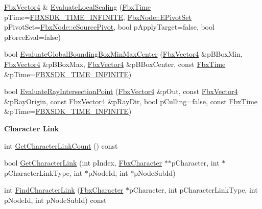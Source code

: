 \begin{Indent}
\begin{DoxyCompactItemize}
\item 
\hyperlink{class_fbx_vector4}{Fbx\+Vector4} \& \hyperlink{class_fbx_node_a4c3a18529955a1c4572850abb8ac37dc}{Evaluate\+Local\+Scaling} (\hyperlink{class_fbx_time}{Fbx\+Time} p\+Time=\hyperlink{fbxtime_8h_a1e6db3fe0f84f0b7daa775739f93526f}{F\+B\+X\+S\+D\+K\+\_\+\+T\+I\+M\+E\+\_\+\+I\+N\+F\+I\+N\+I\+TE}, \hyperlink{class_fbx_node_ae62b7311ac4727654cdf1ebd5cbf7343}{Fbx\+Node\+::\+E\+Pivot\+Set} p\+Pivot\+Set=\hyperlink{class_fbx_node_ae62b7311ac4727654cdf1ebd5cbf7343ae8ed37a5c7e41f8d1cec9d3fa8424b69}{Fbx\+Node\+::e\+Source\+Pivot}, bool p\+Apply\+Target=false, bool p\+Force\+Eval=false)
\item 
bool \hyperlink{class_fbx_node_a0e847ea3d090ef90c79051fd013a5966}{Evaluate\+Global\+Bounding\+Box\+Min\+Max\+Center} (\hyperlink{class_fbx_vector4}{Fbx\+Vector4} \&p\+B\+Box\+Min, \hyperlink{class_fbx_vector4}{Fbx\+Vector4} \&p\+B\+Box\+Max, \hyperlink{class_fbx_vector4}{Fbx\+Vector4} \&p\+B\+Box\+Center, const \hyperlink{class_fbx_time}{Fbx\+Time} \&p\+Time=\hyperlink{fbxtime_8h_a1e6db3fe0f84f0b7daa775739f93526f}{F\+B\+X\+S\+D\+K\+\_\+\+T\+I\+M\+E\+\_\+\+I\+N\+F\+I\+N\+I\+TE})
\item 
bool \hyperlink{class_fbx_node_a4222ab8f1e27e92dd7d62642940c438f}{Evaluate\+Ray\+Intersection\+Point} (\hyperlink{class_fbx_vector4}{Fbx\+Vector4} \&p\+Out, const \hyperlink{class_fbx_vector4}{Fbx\+Vector4} \&p\+Ray\+Origin, const \hyperlink{class_fbx_vector4}{Fbx\+Vector4} \&p\+Ray\+Dir, bool p\+Culling=false, const \hyperlink{class_fbx_time}{Fbx\+Time} \&p\+Time=\hyperlink{fbxtime_8h_a1e6db3fe0f84f0b7daa775739f93526f}{F\+B\+X\+S\+D\+K\+\_\+\+T\+I\+M\+E\+\_\+\+I\+N\+F\+I\+N\+I\+TE})
\end{DoxyCompactItemize}
\end{Indent}
\begin{Indent}\textbf{ Character Link}\par
\begin{DoxyCompactItemize}
\item 
int \hyperlink{class_fbx_node_ad795c16f5ecfbf1c1eadec5045630ad8}{Get\+Character\+Link\+Count} () const
\item 
bool \hyperlink{class_fbx_node_a6e31c35d70b528f5bc0b553b6b0ff82d}{Get\+Character\+Link} (int p\+Index, \hyperlink{class_fbx_character}{Fbx\+Character} $\ast$$\ast$p\+Character, int $\ast$p\+Character\+Link\+Type, int $\ast$p\+Node\+Id, int $\ast$p\+Node\+Sub\+Id)
\item 
int \hyperlink{class_fbx_node_a3b547fc36535edb6cb55cd136b0df4b1}{Find\+Character\+Link} (\hyperlink{class_fbx_character}{Fbx\+Character} $\ast$p\+Character, int p\+Character\+Link\+Type, int p\+Node\+Id, int p\+Node\+Sub\+Id) const
\end{DoxyCompactItemize}
\end{Indent}
